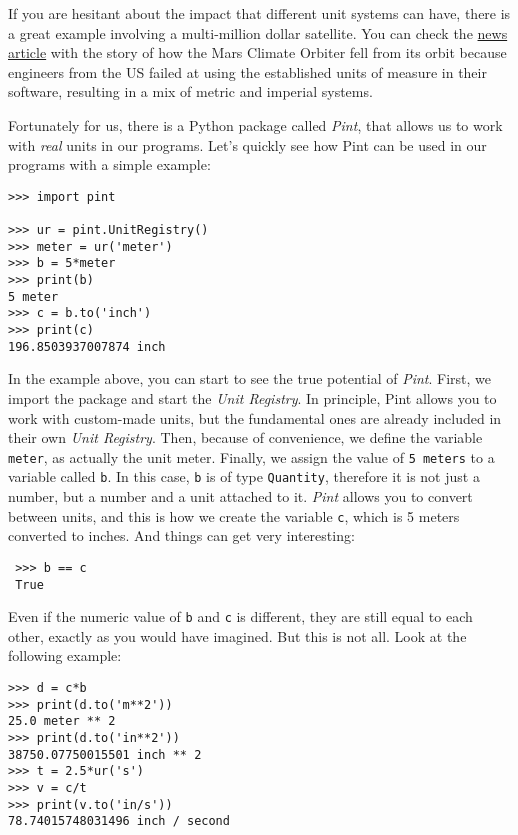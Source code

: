If you are hesitant about the impact that different unit systems can have, there is a great example involving a multi-million dollar satellite. You can check the \href{http://articles.latimes.com/1999/oct/01/news/mn-17288}{news article} with the story of how the Mars Climate Orbiter fell from its orbit because engineers from the US failed at using the established units of measure in their software, resulting in a mix of metric and imperial systems. 

Fortunately for us, there is a Python package called \emph{Pint}, that allows us to work with \emph{real} units in our programs. Let's quickly see how Pint can be used in our programs with a simple example:

\begin{verbatim}
>>> import pint

>>> ur = pint.UnitRegistry()
>>> meter = ur('meter')
>>> b = 5*meter
>>> print(b)
5 meter
>>> c = b.to('inch')
>>> print(c)
196.8503937007874 inch
\end{verbatim}

In the example above, you can start to see the true potential of \emph{Pint}. First, we import the package and start the \emph{Unit
Registry}. In principle, Pint allows you to work with custom-made units, but the fundamental ones are already included in their own \emph{Unit Registry}. Then, because of convenience, we define the variable \texttt{meter}, as actually the unit meter. Finally, we assign the value of \texttt{5 meters} to a variable called \texttt{b}. In this case, \texttt{b} is of type \texttt{Quantity}, therefore it is not just a number, but a number and a unit attached to it. \emph{Pint} allows you to convert between units, and this is how we create the variable \texttt{c}, which is 5 meters converted to inches. And things can get very interesting:

\begin{verbatim}
 >>> b == c
 True
\end{verbatim}

Even if the numeric value of \texttt{b} and \texttt{c} is different, they are still equal to each other, exactly as you would have imagined. But this is not all. Look at the following example:

\begin{verbatim}
>>> d = c*b
>>> print(d.to('m**2'))
25.0 meter ** 2
>>> print(d.to('in**2'))
38750.07750015501 inch ** 2
>>> t = 2.5*ur('s')
>>> v = c/t
>>> print(v.to('in/s'))
78.74015748031496 inch / second
\end{verbatim}

